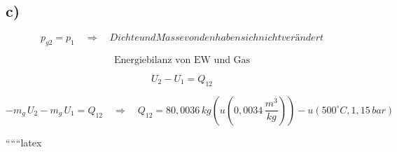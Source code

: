 

\subsection*{c)}
\[
p_{g2} = p_1 \quad \Rightarrow \quad Dichte und Masse von den haben sich nicht verändert
\]

\[
\text{Energiebilanz von EW und Gas}
\]

\[
U_2 - U_1 = Q_{12}
\]

\[
-m_g \, U_2 - m_g \, U_1 = Q_{12} \quad \Rightarrow \quad Q_{12} = 80,0036 \, kg \left( u(0,0034 \, \frac{m^3}{kg}) \right) - u(500^\circ C, 1,15 \, bar)
\]

``````latex